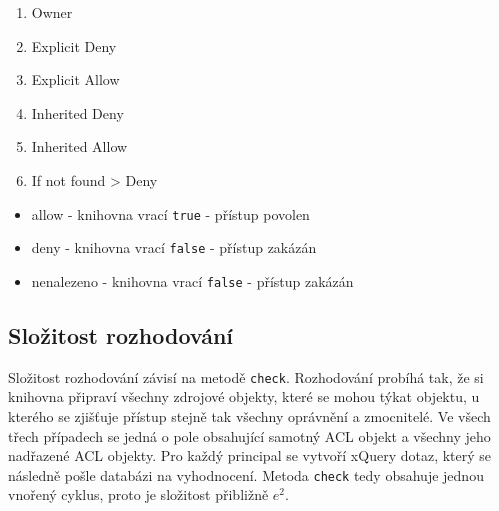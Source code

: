 \begin{enumerate}
\item Owner
\item Explicit Deny
\item Explicit Allow
\item Inherited Deny
\item Inherited Allow
\item If not found > Deny
\end{enumerate}

\begin{itemize}
\item allow - knihovna vrací \verb|true| - přístup povolen
\item deny - knihovna vrací \verb|false| - přístup zakázán
\item nenalezeno - knihovna vrací \verb|false| - přístup zakázán
\end{itemize}

\subsection{Složitost rozhodování}
Složitost rozhodování závisí na metodě \verb|check|. 
Rozhodování probíhá tak, že si knihovna připraví všechny zdrojové objekty, které se mohou týkat objektu, u kterého se zjišťuje přístup stejně tak všechny oprávnění a zmocnitelé. Ve všech třech případech se jedná o pole obsahující samotný ACL objekt a všechny jeho nadřazené ACL objekty. Pro každý principal se vytvoří xQuery dotaz, který se následně pošle databázi na vyhodnocení. Metoda \verb|check| tedy obsahuje jednou vnořený cyklus, proto je složitost přibližně $e^2$.
